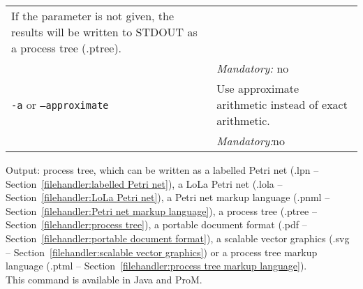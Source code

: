 {\begin{tabularx}{\linewidth}{lX}
If the parameter is not given, the results will be written to STDOUT as a process tree (.ptree).\\
&\textit{Mandatory:} \quad no\\
\texttt{-a} or \texttt{--approximate} & Use approximate arithmetic instead of exact arithmetic.\\
&\textit{Mandatory:}\quad no\\
\bottomrule
\end{tabularx}
\noindent Output: process tree, which can be written as a labelled Petri net (.lpn -- Section~\ref{filehandler:labelled Petri net}), a LoLa Petri net (.lola -- Section~\ref{filehandler:LoLa Petri net}), a Petri net markup language (.pnml -- Section~\ref{filehandler:Petri net markup language}), a process tree (.ptree -- Section~\ref{filehandler:process tree}), a portable document format (.pdf -- Section~\ref{filehandler:portable document format}), a scalable vector graphics (.svg -- Section~\ref{filehandler:scalable vector graphics}) or a process tree markup language (.ptml -- Section~\ref{filehandler:process tree markup language}).
\\This command is available in Java and ProM.
}
